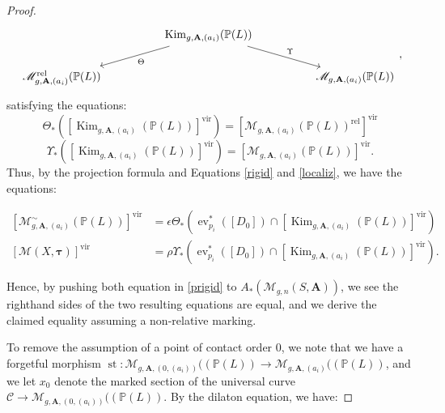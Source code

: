 \documentclass[12pt, oneside]{amsart}   	%
\newcommand{\vir}{\operatorname{vir}}
\newcommand{\ev}{\operatorname{ev}}
\newcommand{\st}{\operatorname{st}}
\newcommand{\rel}{\operatorname{rel}}
\numberwithin{equation}{section}
\numberwithin{thm}{section}
\numberwithin{figure}{section}
\begin{document}
\begin{proof}
\[
\begin{tikzcd}
&&\arrow[dll,"\Theta"] \operatorname{Kim}_{g,\textbf{A},(a_i)}(\mathbb{P}(L)) \arrow[drr,"\Upsilon"]\\
\mathscr{M}^{\rel}_{g,\textbf{A},(a_i)}(\mathbb{P}(L))&&&&\mathscr{M}_{g,\textbf{A},(a_i)}(\mathbb{P}(L))
\end{tikzcd}
,\]
satisfying the equations:
 $$\Theta_*([\operatorname{Kim}_{g,\textbf{A},(a_i)}(\mathbb{P}(L))]^{\vir}) = [\mathscr{M}_{g,\textbf{A},(a_i)}(\mathbb{P}(L))^{\rel}]^{\vir}$$
$$\Upsilon_*([\operatorname{Kim}_{g,\textbf{A},(a_i)}(\mathbb{P}(L))]^{\vir} ) = [\mathscr{M}_{g,\textbf{A},(a_i)}(\mathbb{P}(L))]^{\vir}.$$ Thus, by the projection formula and Equations \ref{rigid} and \ref{localiz}, we have the equations: 

\begin{equation}\label{prigid}
\begin{split}
[\mathscr{M}^{\sim}_{g,\textbf{A},(a_i)}(\mathbb{P}(L))]^{\vir} &= \epsilon\Theta_*(\ev_{p_i}^*([D_0])\cap [\operatorname{Kim}_{g,\textbf{A},(a_i)}(\mathbb{P}(L))]^{\vir})\\
[\mathscr{M}(X,\pmb\tau)]^{\vir} &= \rho\Upsilon_*(\ev_{p_i}^*([D_0])\cap [\operatorname{Kim}_{g,\textbf{A},(a_i)}(\mathbb{P}(L))]^{\vir}).
\end{split}
\end{equation}

Hence, by pushing both equation in \ref{prigid} to $A_*(\mathscr{M}_{g,n}(S,\textbf{A}))$, we see the righthand sides of the two resulting equations are equal, and we derive the claimed equality assuming a non-relative marking. 

To remove the assumption of a point of contact order $0$, we note that we have a forgetful morphism $\st: \mathscr{M}_{g,\textbf{A},(0,(a_i))}((\mathbb{P}(L)) \rightarrow \mathscr{M}_{g,\textbf{A},(a_i)}((\mathbb{P}(L))$, and we let $x_0$ denote the marked section of the universal curve $\mathcal{C} \rightarrow \mathscr{M}_{g,\textbf{A},(0,(a_i))}((\mathbb{P}(L))$. By the dilaton equation, we have:


\end{proof}
\end{document}

